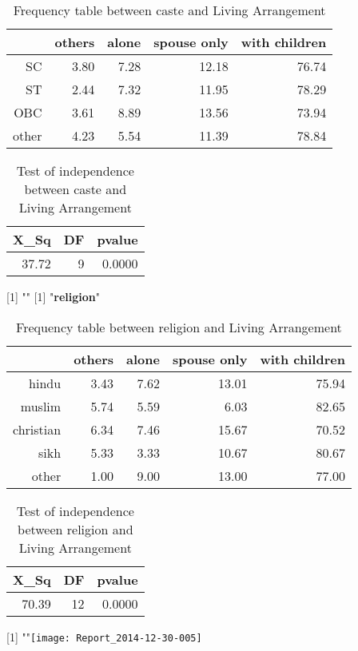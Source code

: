 \documentclass[11pt]{article}
\begin{document}
\begin{table}[H]
\centering
\begin{tabular}{rrrrr}
  \hline
 & others & alone & spouse only & with children \\ 
  \hline
SC & 3.80 & 7.28 & 12.18 & 76.74 \\ 
  ST & 2.44 & 7.32 & 11.95 & 78.29 \\ 
  OBC & 3.61 & 8.89 & 13.56 & 73.94 \\ 
  other & 4.23 & 5.54 & 11.39 & 78.84 \\ 
   \hline
\end{tabular}
\caption{Frequency table between caste and Living Arrangement} 
\end{table}
\begin{table}[H]
\centering
\begin{tabular}{rrr}
  \hline
X\_Sq & DF & pvalue \\ 
  \hline
37.72 & 9 & 0.0000 \\ 
   \hline
\end{tabular}
\caption{Test of independence between caste and Living Arrangement} 
\end{table}
[1] "\newline"
[1] "{\bf{religion}}"
\begin{table}[H]
\centering
\begin{tabular}{rrrrr}
  \hline
 & others & alone & spouse only & with children \\ 
  \hline
hindu & 3.43 & 7.62 & 13.01 & 75.94 \\ 
  muslim & 5.74 & 5.59 & 6.03 & 82.65 \\ 
  christian & 6.34 & 7.46 & 15.67 & 70.52 \\ 
  sikh & 5.33 & 3.33 & 10.67 & 80.67 \\ 
  other & 1.00 & 9.00 & 13.00 & 77.00 \\ 
   \hline
\end{tabular}
\caption{Frequency table between religion and Living Arrangement} 
\end{table}
\begin{table}[H]
\centering
\begin{tabular}{rrr}
  \hline
X\_Sq & DF & pvalue \\ 
  \hline
70.39 & 12 & 0.0000 \\ 
   \hline
\end{tabular}
\caption{Test of independence between religion and Living Arrangement} 
\end{table}
[1] "\newline"\texttt{[image: Report\_2014-12-30-005]}
\end{document}
